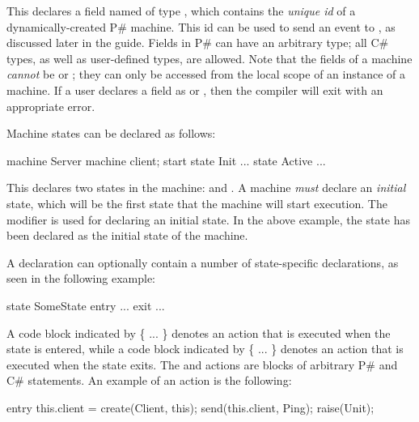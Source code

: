 \documentclass{llncs}
\newcommand{\ps}{P\#\xspace}
\newcommand{\cs}{C\#\xspace}
\begin{document}
\noindent
This declares a field named  of type , which contains the \emph{unique id} of a dynamically-created \ps machine. This id can be used to send an event to , as discussed later in the guide. Fields in \ps can have an arbitrary type; all \cs types, as well as user-defined types, are allowed. Note that the fields of a machine \emph{cannot} be  or ; they can only be accessed from the local scope of an instance of a machine. If a user declares a field as  or , then the compiler will exit with an appropriate error.

Machine states can be declared as follows:

\begin{psharpNoLines}
machine Server {
  machine client;
  start state Init { ... }
  state Active { ... }
}
\end{psharpNoLines}

\noindent
This declares two states in the  machine:  and . A machine \emph{must} declare an \emph{initial} state, which will be the first state that the machine will start execution. The  modifier is used for declaring an initial state. In the above example, the  state has been declared as the initial state of the  machine.

A  declaration can optionally contain a number of state-specific declarations, as seen in the following example:

\begin{psharpNoLines}
state SomeState {
  entry { ... }
  exit { ... }
}
\end{psharpNoLines}

\noindent
A code block indicated by  \{ ... \} denotes an action that is executed when the state is entered, while a code block indicated by  \{ ... \} denotes an action that is executed when the state exits. The  and  actions are blocks of arbitrary \ps and \cs statements. An example of an  action is the following:

\begin{psharpNoLines}
entry {
  this.client = create(Client, this);
  send(this.client, Ping);
  raise(Unit);
}
\end{psharpNoLines}
\end{document}
